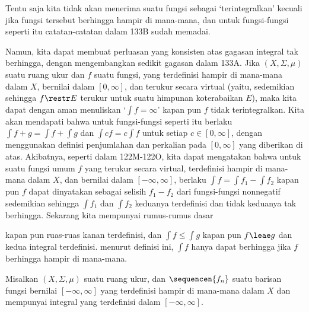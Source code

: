 


Tentu saja kita tidak akan menerima suatu fungsi sebagai `terintegralkan'
kecuali jika fungsi tersebut berhingga hampir di mana-mana, dan untuk
fungsi-fungsi seperti itu catatan-catatan dalam 133B sudah memadai.

 Namun, kita dapat membuat perluasan yang konsisten
atas gagasan integral tak berhingga, dengan mengembangkan sedikit gagasan
dalam 133A. Jika $(X,\Sigma,\mu)$ suatu ruang ukur dan $f$ suatu fungsi,
yang terdefinisi hampir di mana-mana dalam $X$, bernilai dalam
$[0,\infty]$, dan terukur secara virtual (yaitu, sedemikian sehingga
$f\restr E$ terukur untuk suatu himpunan
koterabaikan $E$), maka kita dapat dengan aman menuliskan
`$\int f=\infty$' kapan pun $f$ tidak terintegralkan. Kita akan mendapati
bahwa untuk fungsi-fungsi seperti itu berlaku
$\int f+g=\int f+\int g$ dan $\int cf=c\int f$ untuk setiap
$c\in[0,\infty]$, dengan menggunakan definisi penjumlahan dan perkalian
pada $[0,\infty]$ yang diberikan di atas. Akibatnya, seperti dalam
122M-122O, %
kita dapat mengatakan bahwa untuk suatu fungsi umum $f$ yang terukur secara
virtual, terdefinisi hampir di mana-mana dalam $X$, dan bernilai dalam
$[-\infty,\infty]$, berlaku $\int f=\int f_1-\int f_2$ kapan pun $f$
dapat dinyatakan sebagai selisih $f_1-f_2$ dari fungsi-fungsi nonnegatif
sedemikian sehingga $\int f_1$ dan $\int f_2$ keduanya terdefinisi dan
tidak keduanya tak berhingga. Sekarang kita mempunyai rumus-rumus dasar


\noindent kapan pun ruas-ruas kanan terdefinisi, dan $\int f\le\int g$
kapan pun $f\leae g$ dan kedua integral terdefinisi.
 menurut definisi ini,
$\int f$ hanya dapat berhingga jika $f$ berhingga hampir di mana-mana.

 Misalkan $(X,\Sigma,\mu)$ suatu ruang ukur, dan
$\sequencen{f_n}$ suatu barisan fungsi bernilai $[-\infty,\infty]$ yang
terdefinisi hampir di mana-mana dalam $X$ dan mempunyai integral yang
terdefinisi dalam $[-\infty,\infty]$.

